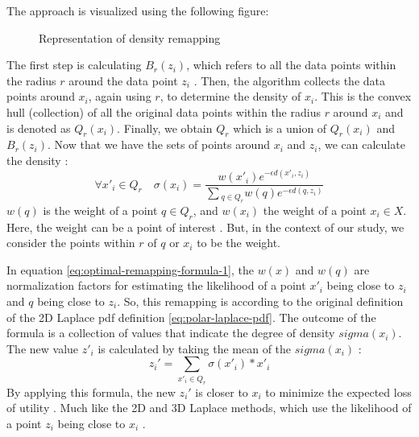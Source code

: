 The approach is visualized using the following figure:
\begin{figure}[H]
  
  \label{fig:optimal-remapping}
  \caption{Representation of density remapping \citep{chatzikokolakis_efficient_2017}}
\end{figure}
The first step is calculating $B_r(z_i)$, which refers to all the data points within the radius $r$ around the data point $z_i$ \citep{chatzikokolakis_efficient_2017}.
Then, the algorithm collects the data points around $x_i$, again using $r$, to determine the density of $x_i$.
This is the convex hull (collection) of all the original data points within the radius $r$ around $x_i$ and is denoted as $Q_r (x_i)$.
Finally, we obtain $Q_r$ which is a union of $Q_r (x_i)$ and $B_r(z_i)$.
Now that we have the sets of points around $x_i$ and $z_i$, we can calculate the density \citep{chatzikokolakis_efficient_2017}:
\begin{equation}
  \forall x'_i \in Q_r \quad \sigma(x_i) = \frac{w(x'_i)e^{-\epsilon d(x'_i, z_i)}}{\sum{_{q\in Q_r} w(q)e^{-\epsilon d(q, z_i)}}}
  \label{eq:optimal-remapping-formula-1}
\end{equation}
$w(q)$ is the weight of a point $q \in Q_r$, and $w(x_i)$ the weight of a point $x_i \in X$.
Here, the weight can be a point of interest \citep{chatzikokolakis_efficient_2017}.
But, in the context of our study, we consider the points within $r$ of $q$ or $x_i$ to be the weight.

In equation \ref{eq:optimal-remapping-formula-1}, the $w(x)$ and $w(q)$ are normalization factors for estimating the likelihood of a point $x'_i$ being close to $z_i$ and $q$ being close to $z_i$.
So, this remapping is according to the original definition of the 2D Laplace \gls{pdf} definition \ref{eq:polar-laplace-pdf}.
The outcome of the formula is a collection of values that indicate the degree of density $sigma(x_i)$.
The new value $z'_i$ is calculated by taking the mean of the $sigma(x_i)$ \citep{chatzikokolakis_efficient_2017}:
\begin{equation}
  z_i' = \sum_{x'_i \in Q_r} \sigma(x'_i) * x'_i
  \label{eq:optimal-remapping-formula-2}
\end{equation}
By applying this formula, the new $z_i'$ is closer to $x_i$ to minimize the expected loss of utility \citep{chatzikokolakis_efficient_2017}.
Much like the 2D and 3D Laplace methods, which use the likelihood of a point $z_i$ being close to $x_i$ \citep{DBLP:journals/corr/abs-1212-1984, 9646489}.

